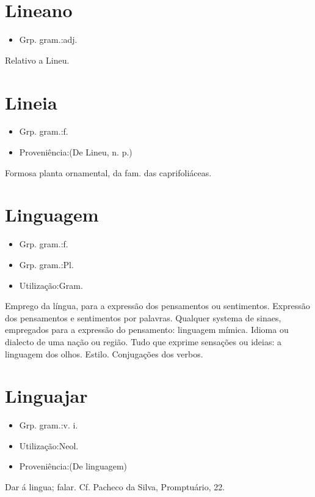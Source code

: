 \section{Lineano}
\begin{itemize}
\item {Grp. gram.:adj.}
\end{itemize}
Relativo a Lineu.
\section{Lineia}
\begin{itemize}
\item {Grp. gram.:f.}
\end{itemize}
\begin{itemize}
\item {Proveniência:(De \textunderscore Lineu\textunderscore , n. p.)}
\end{itemize}
Formosa planta ornamental, da fam. das caprifoliáceas.
\section{Linguagem}
\begin{itemize}
\item {Grp. gram.:f.}
\end{itemize}
\begin{itemize}
\item {Grp. gram.:Pl.}
\end{itemize}
\begin{itemize}
\item {Utilização:Gram.}
\end{itemize}
Emprego da língua, para a expressão dos pensamentos ou sentimentos.
Expressão dos pensamentos e sentimentos por palavras.
Qualquer systema de sinaes, empregados para a expressão do pensamento: \textunderscore linguagem mímica\textunderscore .
Idioma ou dialecto de uma nação ou região.
Tudo que exprime sensações ou ideias: \textunderscore a linguagem dos olhos\textunderscore .
Estilo.
Conjugações dos verbos.
\section{Linguajar}
\begin{itemize}
\item {Grp. gram.:v. i.}
\end{itemize}
\begin{itemize}
\item {Utilização:Neol.}
\end{itemize}
\begin{itemize}
\item {Proveniência:(De \textunderscore linguagem\textunderscore )}
\end{itemize}
Dar á lingua; falar. Cf. Pacheco da Silva, \textunderscore Promptuário\textunderscore , 22.
